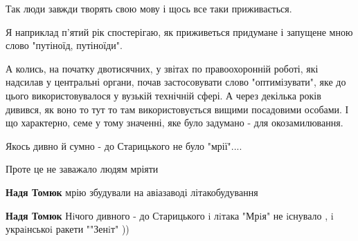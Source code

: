 \begin{itemize}
Так люди завжди творять свою мову і щось все таки приживається.

Я наприклад п'ятий рік спостерігаю, як приживеться придумане і запущене мною
слово "путіноїд, путіноїди".

А колись, на початку двотисячних, у звітах по правоохоронній роботі, які
надсилав у центральні органи, почав застосовувати слово "оптимізувати", яке до
цього використовувалося у вузькій технічній сфері. А через декілька років
дивився, як воно то тут то там використовується вищими посадовими особами. І що
характерно, семе у тому значенні, яке було задумано - для окозамилювання.


 
Якось дивно й сумно - до Старицького не було "мрії"....

\begin{itemize}
 
Проте це не заважало людям мріяти \Smiley[1.0][yellow]

 
\textbf{Надя Томюк} мрію збудували на авіазаводі літакобудування

 
\textbf{Надя Томюк} Нiчого дивного - до Старицького i лiтака "Мрiя" не iснувало , i украiнськоi ракети ""Зенiт" ))
\end{itemize}

 

\end{itemize}
